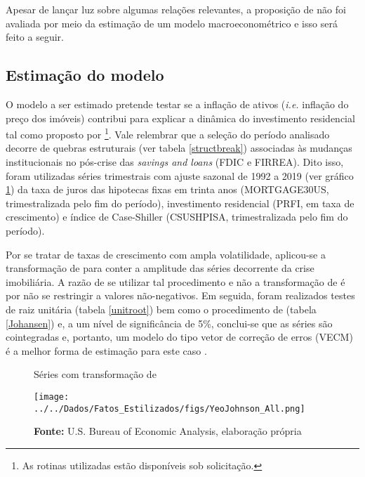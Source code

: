 Apesar de lançar luz sobre algumas relações relevantes, a proposição de \textcite{teixeira_crescimento_2015} não foi avaliada por meio da estimação de um modelo macroeconométrico e isso será feito a seguir.

\subsection{Estimação do modelo}

O modelo a ser estimado pretende testar se a inflação de ativos (\textit{i.e.} inflação do preço dos imóveis) contribui para explicar a dinâmica do investimento residencial tal como proposto por \textcite{teixeira_crescimento_2015}\footnote{As rotinas utilizadas estão disponíveis sob solicitação.}. 
Vale relembrar que a seleção do período analisado decorre de quebras estruturais (ver tabela \ref{structbreak}) associadas às mudanças institucionais no pós-crise das \textit{savings and loans} (FDIC e FIRREA).
Dito isso, foram utilizadas séries trimestrais com ajuste sazonal de 1992 a 2019 (ver gráfico \ref{YeoJhonson}) da taxa de juros das hipotecas fixas em trinta anos (MORTGAGE30US, trimestralizada pelo fim do período), investimento residencial (PRFI, em taxa de crescimento) e índice de Case-Shiller (CSUSHPISA, trimestralizada pelo fim do período). 

Por se tratar de taxas de crescimento com ampla volatilidade, aplicou-se a transformação de \textcite{yeo_new_2000} para conter a amplitude das séries decorrente da crise imobiliária. A razão de se utilizar tal procedimento e não a transformação de \textcite{box_analysis_1964} é por não se restringir a valores não-negativos. Em seguida, foram realizados testes de raiz unitária (tabela \ref{unitroot}) bem como o procedimento de \textcite{johansen_estimation_1991} (tabela \ref{Johansen}) e, a um nível de significância de 5\%, conclui-se que as séries são cointegradas e, portanto, um modelo do tipo vetor de correção de erros (VECM) é a melhor forma de estimação para este caso \cite{enders_applied_2014}.








\begin{figure}[htb]
	\centering
	\caption{Séries com transformação de \textcite{yeo_new_2000}}
	\label{YeoJhonson}
	\texttt{[image: ../../Dados/Fatos\_Estilizados/figs/YeoJohnson\_All.png]}
	\caption*{\textbf{Fonte:} U.S. Bureau of Economic Analysis, elaboração própria}
\end{figure}


